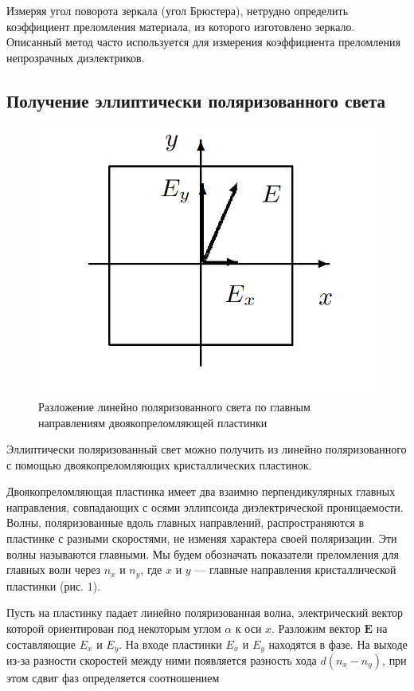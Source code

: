 \documentclass[a4paper, 12pt]{article}
\begin{document}
Измеряя угол поворота зеркала (угол Брюстера), нетрудно определить коэффициент преломления материала, из которого изготовлено
зеркало. Описанный метод часто используется для измерения коэффициента преломления непрозрачных диэлектриков.

\subsection{Получение эллиптически поляризованного света}
\begin{figure} 
	\includegraphics[width=\linewidth]{1}
	\caption{Разложение линейно поляризованного света по главным направлениям двоякопреломляющей пластинки}
	\label{ris 1}
\end{figure}

Эллиптически поляризованный свет можно получить из линейно поляризованного с
помощью двоякопреломляющих кристаллических пластинок.

Двоякопреломляющая пластинка имеет два взаимно перпендикулярных главных направления, совпадающих с осями эллипсоида диэлектрической проницаемости. Волны, поляризованные вдоль главных направлений, распространяются в пластинке с разными скоростями, не изменяя характера своей поляризации. Эти волны называются главными. Мы будем обозначать показатели преломления для главных волн через $ n_x $ и $ n_y $, где $ x $ и $ y $ --- главные направления кристаллической пластинки (рис. 1).

Пусть на пластинку падает линейно поляризованная волна, электрический вектор которой ориентирован под некоторым углом $ \alpha $ к оси
$ x $. Разложим вектор $ \mathbf{E} $ на составляющие $ E_x $ и $ E_y $. На входе пластинки $ E_x $ и $ E_y $ находятся в фазе. На выходе из-за разности скоростей между ними появляется разность хода $ d(n_x - n_y) $, при этом сдвиг фаз определяется соотношением
\end{document}
